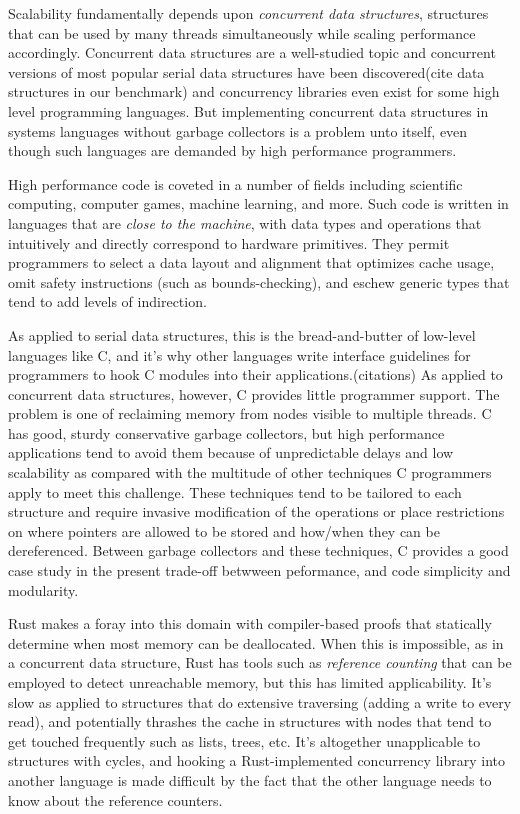 Scalability fundamentally depends upon \textit{concurrent data structures}, structures that can be used by many threads simultaneously while scaling performance accordingly.  Concurrent data structures are a well-studied topic and concurrent versions of most popular serial data structures have been discovered\cite{Harris}(cite data structures in our benchmark) and concurrency libraries even exist for some high level programming languages.\cite{JavaUtilConcurrent}  But implementing concurrent data structures in systems languages without garbage collectors is a problem unto itself, even though such languages are demanded by high performance programmers.

High performance code is coveted in a number of fields including scientific computing, computer games, machine learning, and more.  Such code is written in languages that are \textit{close to the machine}, with data types and operations that intuitively and directly correspond to hardware primitives.\cite{Ritchie}  They permit programmers to select a data layout and alignment that optimizes cache usage, omit safety instructions (such as bounds-checking), and eschew generic types that tend to add levels of indirection.

As applied to serial data structures, this is the bread-and-butter of low-level languages like C, and it's why other languages write interface guidelines for programmers to hook C modules into their applications.(citations)  As applied to concurrent data structures, however, C provides little programmer support.  The problem is one of reclaiming memory from nodes visible to multiple threads.  C has good, sturdy conservative garbage collectors\cite{BDW}\cite{DotNetGC}, but high performance applications tend to avoid them because of unpredictable delays and low scalability as compared with the multitude of other techniques C programmers apply to meet this challenge.  These techniques tend to be tailored to each structure and require invasive modification of the operations or place restrictions on where pointers are allowed to be stored and how/when they can be dereferenced.\cite{HP}\cite{DTA}\cite{StackTrack}\cite{Threadscan}  Between garbage collectors and these techniques, C provides a good case study in the present trade-off betwween peformance, and code simplicity and modularity.

Rust\cite{Rust} makes a foray into this domain with compiler-based proofs that statically determine when most memory can be deallocated.  When this is impossible, as in a concurrent data structure, Rust has tools such as \textit{reference counting} that can be employed to detect unreachable memory, but this has limited applicability.  It's slow as applied to structures that do extensive traversing (adding a write to every read), and potentially thrashes the cache in structures with nodes that tend to get touched frequently such as lists, trees, etc.  It's altogether unapplicable to structures with cycles, and hooking a Rust-implemented concurrency library into another language is made difficult by the fact that the other language needs to know about the reference counters.


